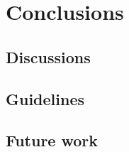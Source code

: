 \chapter{Conclusions}
\label{conclusions}

\section{Discussions}
\label{sec:discussion}

\section{Guidelines}
\label{sec:guidelines}

\section{Future work}
\label{sec:futurework}